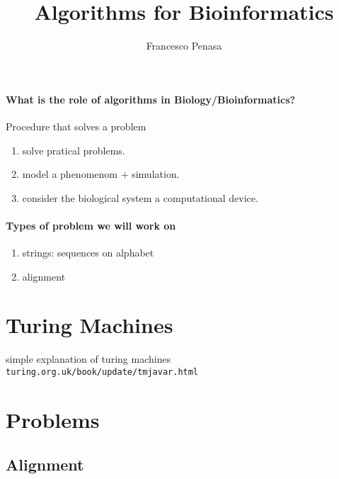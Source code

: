\documentclass[11pt]{article}
\begin{document}
\author{Francesco Penasa}
\title{Algorithms for Bioinformatics}
\maketitle

\medskip


\paragraph{What is the role of algorithms in Biology/Bioinformatics?} %
\label{par:paragraph_name}

Procedure that solves a problem
\begin{enumerate}
	\item solve pratical problems.
	\item model a phenomenom $+$ simulation.
	\item consider the biological system a computational device.
\end{enumerate}

\paragraph{Types of problem we will work on} %
\label{par:types_of_problem_we_will_work_on}

\begin{enumerate}
	\item strings:  sequences on alphabet
	\item alignment
\end{enumerate}

\section{Turing Machines} %
\label{sec:turing_machines}
simple explanation of turing machines\\
\texttt{turing.org.uk/book/update/tmjavar.html}


\section{Problems} %
\label{sec:problems}
\subsection{Alignment} %
\label{sub:alignment}
\end{document}
